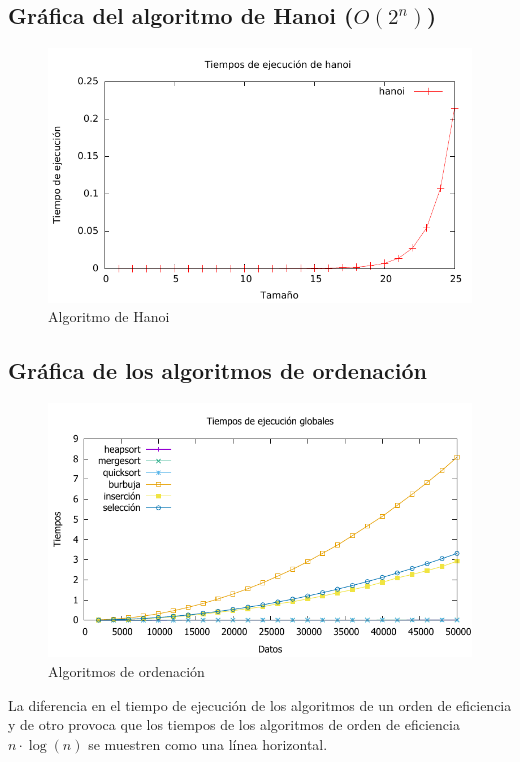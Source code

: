 \documentclass[a4paper, 11pt]{article}
\begin{document}
\newpage
\subsection{Gráfica del algoritmo de Hanoi ($O(2^n)$)}
\begin{figure}[h] \includegraphics[width=13cm]{hanoi_g} \centering
	\caption{Algoritmo de Hanoi} \end{figure}


\subsection{Gráfica de los algoritmos de ordenación}
\begin{figure}[h] \includegraphics[width=14cm]{comparativa_global_g} \centering
	\caption{Algoritmos de ordenación} \end{figure}

La diferencia en el tiempo de ejecución de los algoritmos de un orden de eficiencia y de otro provoca que los tiempos de los algoritmos de orden de eficiencia $n \cdot \log (n)$ se muestren como una línea horizontal.
\end{document}
